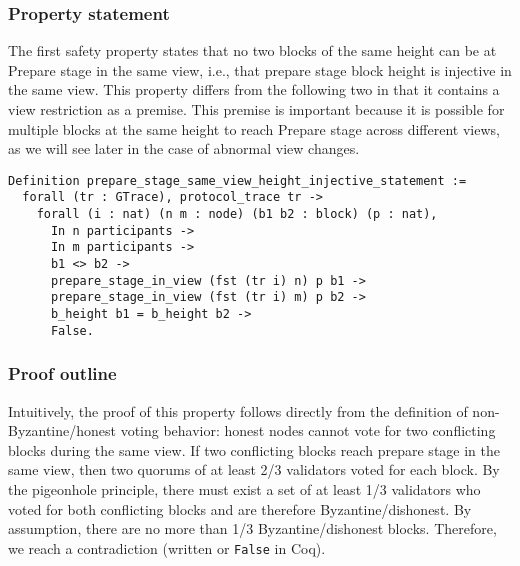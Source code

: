 \documentclass{easychair}
\begin{document}
\subsubsection{Property statement}
The first safety property states that no two blocks of the same height can be at Prepare stage in the same view, i.e., that prepare stage block height is injective in the same view. This property differs from the following two in that it contains a view restriction as a premise. This premise is important because it is possible for multiple blocks at the same height to reach Prepare stage across different views, as we will see later in the case of abnormal view changes.
\begin{lstlisting}[language=Coq]
Definition prepare_stage_same_view_height_injective_statement :=
  forall (tr : GTrace), protocol_trace tr ->
    forall (i : nat) (n m : node) (b1 b2 : block) (p : nat),
      In n participants ->
      In m participants ->
      b1 <> b2 ->
      prepare_stage_in_view (fst (tr i) n) p b1 -> 
      prepare_stage_in_view (fst (tr i) m) p b2 ->      
      b_height b1 = b_height b2 ->
      False.
\end{lstlisting}

\subsubsection{Proof outline}
Intuitively, the proof of this property follows directly from the definition of non-Byzantine/honest voting behavior: honest nodes cannot vote for two conflicting blocks during the same view. If two conflicting blocks reach prepare stage in the same view, then two quorums of at least 2/3 validators voted for each block. By the pigeonhole principle, there must exist a set of at least 1/3 validators who voted for both conflicting blocks and are therefore Byzantine/dishonest. By assumption, there are no more than 1/3 Byzantine/dishonest blocks. Therefore, we reach a contradiction (written  or \texttt{False} in Coq).
\end{document}
